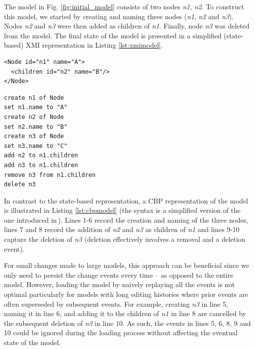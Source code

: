 \documentclass{llncs}
\begin{document}
The model in Fig. \ref{fig:initial_model} consists of two nodes \emph{n1}, \emph{n2}.
To construct this model, we started by creating and naming three nodes (\emph{n1}, \emph{n2} and \emph{n3}).
Nodes \emph{n2} and \emph{n3} were then added as children of \emph{n1}.
Finally, node \emph{n3} was deleted from the model.
The final state of the model is presented in a simplified (state-based) XMI representation in Listing \ref{lst:xmimodel}.

\noindent
\begin{minipage}[t]{0.5\linewidth}
\begin{lstlisting}[style=xmi,caption={State-based representation of the tree model in (simplified) XMI.},label=lst:xmimodel]
<Node id="n1" name="A">
  <children id="n2" name="B"/>
</Node>
\end{lstlisting}
\end{minipage}
\hfill
\begin{minipage}[t]{0.5\linewidth}
\begin{lstlisting}[style=eol,caption={Change-based representation of the tree model.},label=lst:cbpmodel]
create n1 of Node
set n1.name to "A"      
create n2 of Node
set n2.name to "B"      
create n3 of Node
set n3.name to "C"      
add n2 to n1.children   
add n3 to n1.children
remove n3 from n1.children   
delete n3
\end{lstlisting}
\end{minipage}

In contrast to the state-based representation, a CBP representation of the model is illustrated in Listing \ref{lst:cbpmodel} (the syntax is a simplified version of the one introduced in\,\cite{yohannis2017turning}).
Lines 1-6 record the creation and naming of the three nodes, lines 7 and 8 record the addition of \emph{n2} and \emph{n3} as children of \emph{n1} and lines 9-10 capture the deletion of \emph{n3} (deletion effectively involves a removal and a deletion event).


For small changes made to large models, this approach can be beneficial since we only need to persist the change events every time -- as opposed to the entire model.
However, loading the model by naively replaying all the events is not optimal particularly for models with long editing histories where prior events are often superseded by subsequent events. For example, creating \emph{n3} in line 5, naming it in line 6, and adding it to the children of \emph{n1} in line 8 are cancelled by the subsequent deletion of \emph{n3} in line 10. As such, the events in lines 5, 6, 8, 9 and 10 could be ignored during the loading process without affecting the eventual state of the model.
\end{document}
